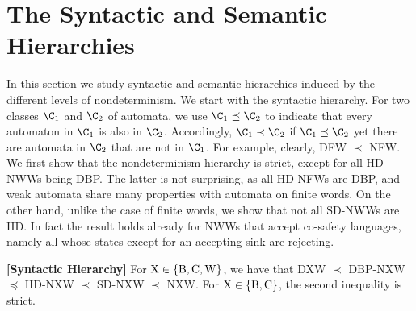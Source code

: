 \documentclass{lmcs}
\begin{document}
\section{The Syntactic and Semantic Hierarchies}


In this section we study syntactic and semantic hierarchies induced by the different levels of nondeterminism. We start with the syntactic hierarchy. For two classes $\C_1$ and $\C_2$ of automata, we use $\C_1 \preceq \C_2$ to indicate that every automaton in $\C_1$ is also in $\C_2$. Accordingly, $\C_1 \prec \C_2$ if $\C_1 \preceq \C_2$ yet there are automata in $\C_2$ that are not in $\C_1$. For example, clearly, DFW $\prec$ NFW. We first show that the nondeterminism hierarchy is strict, except for all HD-NWWs being DBP. The latter is not surprising, as all HD-NFWs are DBP, and weak automata share many properties with automata on finite words. On the other hand, unlike the case of finite words, we show that not all SD-NWWs are HD. In fact the result holds already for NWWs that accept co-safety languages, namely all whose states except for an accepting sink are rejecting. 

\begin{thm}{\bf [Syntactic Hierarchy]}
	For ${\rm X} \in \{{\rm B,C,W}\}$, we have that {\rm DXW} $\prec$ {\rm DBP-NXW} $\preceq$ {\rm HD-NXW} $\prec$ {\rm SD-NXW} $\prec$ {\rm NXW}. For ${\rm X} \in \{{\rm B,C}\}$, the second inequality is strict.
\end{thm}
\end{document}
